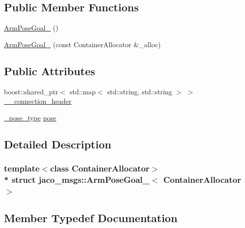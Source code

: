 \subsection*{Public Member Functions}
\begin{DoxyCompactItemize}
\item 
\hyperlink{structjaco__msgs_1_1ArmPoseGoal___ae3264330d49f19b8fc7dfa4bd186ed4b}{Arm\+Pose\+Goal\+\_\+} ()
\item 
\hyperlink{structjaco__msgs_1_1ArmPoseGoal___a632af32f58ce624b50d654790a870cd4}{Arm\+Pose\+Goal\+\_\+} (const Container\+Allocator \&\+\_\+alloc)
\end{DoxyCompactItemize}
\subsection*{Public Attributes}
\begin{DoxyCompactItemize}
\item 
boost\+::shared\+\_\+ptr$<$ std\+::map$<$ std\+::string, std\+::string $>$ $>$ \hyperlink{structjaco__msgs_1_1ArmPoseGoal___a3c8e909530b298da5706f74861231e4e}{\+\_\+\+\_\+connection\+\_\+header}
\item 
\hyperlink{structjaco__msgs_1_1ArmPoseGoal___a000eb0e79cdb7de7c51bac91709ffae0}{\+\_\+pose\+\_\+type} \hyperlink{structjaco__msgs_1_1ArmPoseGoal___a3c02a8adbfcd7515a82e5a4746118e05}{pose}
\end{DoxyCompactItemize}


\subsection{Detailed Description}
\subsubsection*{template$<$class Container\+Allocator$>$\\*
struct jaco\+\_\+msgs\+::\+Arm\+Pose\+Goal\+\_\+$<$ Container\+Allocator $>$}



\subsection{Member Typedef Documentation}
